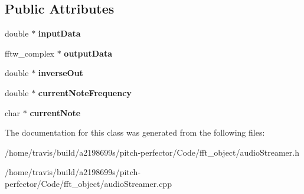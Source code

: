 \subsection*{Public Attributes}
\begin{DoxyCompactItemize}
\item 
\hypertarget{classaudioStreamer_a392bb08783c92e356e704f40ff6a109a}{double $\ast$ {\bfseries input\-Data}}\label{classaudioStreamer_a392bb08783c92e356e704f40ff6a109a}

\item 
\hypertarget{classaudioStreamer_ab44575639696ec28e58a0ca4d5e7d099}{fftw\-\_\-complex $\ast$ {\bfseries output\-Data}}\label{classaudioStreamer_ab44575639696ec28e58a0ca4d5e7d099}

\item 
\hypertarget{classaudioStreamer_a1d8289cf32dd73375172f06c998d7a9f}{double $\ast$ {\bfseries inverse\-Out}}\label{classaudioStreamer_a1d8289cf32dd73375172f06c998d7a9f}

\item 
\hypertarget{classaudioStreamer_a7c2310503ad50698933184fab223fd25}{double $\ast$ {\bfseries current\-Note\-Frequency}}\label{classaudioStreamer_a7c2310503ad50698933184fab223fd25}

\item 
\hypertarget{classaudioStreamer_a05ce3d9726f4c736652b85b94c51c33f}{char $\ast$ {\bfseries current\-Note}}\label{classaudioStreamer_a05ce3d9726f4c736652b85b94c51c33f}

\end{DoxyCompactItemize}


The documentation for this class was generated from the following files\-:\begin{DoxyCompactItemize}
\item 
/home/travis/build/a2198699s/pitch-\/perfector/\-Code/fft\-\_\-object/audio\-Streamer.\-h\item 
/home/travis/build/a2198699s/pitch-\/perfector/\-Code/fft\-\_\-object/audio\-Streamer.\-cpp\end{DoxyCompactItemize}
